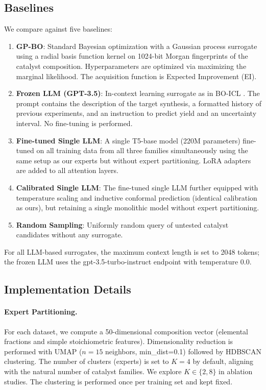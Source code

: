 \documentclass{article}
\begin{document}
\subsection{Baselines}
We compare against five baselines:
\begin{enumerate}[label={(\arabic*)}]
    \item \textbf{GP-BO}: Standard Bayesian optimization with a Gaussian process surrogate using a radial basis function kernel on 1024-bit Morgan fingerprints of the catalyst composition. Hyperparameters are optimized via maximizing the marginal likelihood. The acquisition function is Expected Improvement (EI).
    \item \textbf{Frozen LLM (GPT-3.5)}: In-context learning surrogate as in BO-ICL \cite{liu2023}. The prompt contains the description of the target synthesis, a formatted history of previous experiments, and an instruction to predict yield and an uncertainty interval. No fine-tuning is performed.
    \item \textbf{Fine-tuned Single LLM}: A single T5-base model (220M parameters) fine-tuned on all training data from all three families simultaneously using the same setup as our experts but without expert partitioning. LoRA adapters are added to all attention layers.
    \item \textbf{Calibrated Single LLM}: The fine-tuned single LLM further equipped with temperature scaling and inductive conformal prediction (identical calibration as ours), but retaining a single monolithic model without expert partitioning.
    \item \textbf{Random Sampling}: Uniformly random query of untested catalyst candidates without any surrogate.
\end{enumerate}
For all LLM-based surrogates, the maximum context length is set to 2048 tokens; the frozen LLM uses the gpt-3.5-turbo-instruct endpoint with temperature 0.0.

\subsection{Implementation Details}
\paragraph{Expert Partitioning.} For each dataset, we compute a 50-dimensional composition vector (elemental fractions and simple stoichiometric features). Dimensionality reduction is performed with UMAP ($n=15$ neighbors, min\_dist=0.1) followed by HDBSCAN clustering. The number of clusters (experts) is set to $K=4$ by default, aligning with the natural number of catalyst families. We explore $K \in \{2,8\}$ in ablation studies. The clustering is performed once per training set and kept fixed.
\end{document}
